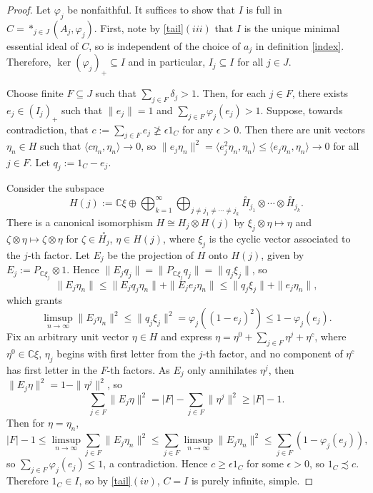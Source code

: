 \documentclass[10pt,a4paper]{amsart}
\begin{document}
\begin{proof}
    Let $\varphi_j$ be nonfaithful. It suffices to show that $I$ is full in $C=\ast_{j\in J}(A_j,\varphi_j)$. First, note by \ref{tail}$(iii)$ that $I$ is the unique minimal essential ideal of $C$, so is independent of the choice of $a_j$ in definition \ref{index}. Therefore, $\ker(\varphi_j)_+\subseteq I$ and in particular, $I_j\subseteq I$ for all $j\in J$.
    
    Choose finite $F\subseteq J$ such that $\sum_{j\in F}\delta_j>1$. Then, for each $j\in F$, there exists $e_j\in (I_j)_+$ such that $\|e_j\|=1$ and $\sum_{j\in F}\varphi_j(e_j)>1$. Suppose, towards contradiction, that $c:=\sum_{j\in F}e_j\not\geq \epsilon1_C$ for any $\epsilon>0$. Then there are unit vectors $\eta_n\in H$ such that $\langle c\eta_n,\eta_n\rangle\rightarrow 0$, so $\|e_j\eta_n\|^2=\langle e_j^2\eta_n,\eta_n\rangle\leq \langle e_j\eta_n,\eta_n\rangle\rightarrow 0$ for all $j\in F$. Let $q_j:=1_C-e_j$. 
    
    Consider the subspace
    \[H(j):=\mathbb{C}\xi\oplus\bigoplus_{k=1}^\infty\bigoplus_{j\neq j_1\neq\cdots\neq j_k}\overset{\circ}{H}_{j_1}\otimes\cdots\otimes\overset{\circ}{H}_{j_k}.\]
    There is a canonical isomorphism $H\cong H_j\otimes H(j)$ by $\xi_j\otimes \eta\mapsto \eta$ and $\zeta\otimes \eta\mapsto\zeta\otimes \eta$ for $\zeta\in \overset{\circ}{H_j}$, $\eta\in H(j)$, where $\xi_j$ is the cyclic vector associated to the $j$-th factor. Let $E_j$ be the projection of $H$ onto $H(j)$, given by $E_j:=P_{\mathbb{C}\xi_j}\otimes 1$. Hence $\|E_jq_j\|=\|P_{\mathbb{C}\xi_j}q_j\|=\|q_j\xi_j\|$, so
    \[\|E_j\eta_n\|\leq \|E_jq_j\eta_n\|+\|E_je_j\eta_n\|\leq\|q_j\xi_j\|+\|e_j\eta_n\|,\]
    which grants \[\limsup_{n\rightarrow\infty}\|E_j\eta_n\|^2\leq\|q_j\xi_j\|^2=\varphi_j((1-e_j)^2)\leq 1-\varphi_j(e_j).\]
    Fix an arbitrary unit vector $\eta\in H$ and express $\eta=\eta^0+\sum_{j\in F}\eta^j+\eta^c$, where $\eta^0\in\mathbb{C}\xi$, $\eta_j$ begins with first letter from the $j$-th factor, and no component of $\eta^c$ has first letter in the $F$-th factors. As $E_j$ only annihilates $\eta^j$, then $\|E_j\eta\|^2=1-\|\eta^j\|^2$, so
    \[\sum_{j\in F}\|E_j\eta\|^2=|F|-\sum_{j\in F}\|\eta^j\|^2\geq |F|-1.\]
    Then for $\eta=\eta_n$,
    \[|F|-1\leq \limsup_{n\rightarrow\infty}\sum_{j\in F}\|E_j\eta_n\|^2\leq\sum_{j\in F}\limsup_{n\rightarrow\infty}\|E_j\eta_n\|^2\leq\sum_{j\in F}(1-\varphi_j(e_j)),\]
    so $\sum_{j\in F}\varphi_j(e_j)\leq 1$, a contradiction. Hence $c\geq \epsilon 1_C$ for some $\epsilon>0$, so $1_C\precsim c$. Therefore $1_C\in I$, so by \ref{tail}$(iv)$, $C=I$ is purely infinite, simple.


\end{proof}
\end{document}
